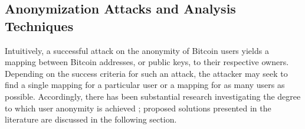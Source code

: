 

\subsection{Anonymization Attacks and Analysis Techniques} \label{sec:attacks}

Intuitively, a successful attack on the anonymity of Bitcoin users yields a mapping between Bitcoin addresses, or public keys, to their respective owners. Depending on the success criteria for such an attack, the attacker may seek to find a single mapping for a particular user or a mapping for as many users as possible. Accordingly, there has been substantial research investigating the degree to which user anonymity is achieved \cite{ReidHarrigan13,BetterToBitter,Fistful12,Shamir13-bitcoingraph,Androulaki12-privacy}; proposed solutions presented in the literature are discussed in the following section.

